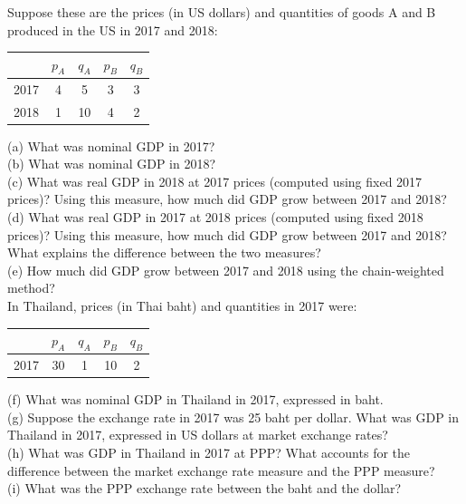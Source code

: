 \documentclass[12pt, letterpaper]{article}
\begin{document}
\begin{tcolorbox}[evenbox,title={Problem 1.2 \quad Comparisons Across Time and Across Countries}]
\begin{tcolorbox}[questionbox]
Suppose these are the prices (in US dollars) and quantities of goods A and B produced in the
US in 2017 and 2018:
\begin{center}
\begin{tabular}{ccccc}
\toprule
 & $p_A$ & $q_A$ & $p_B$ & $q_B$ \\
\midrule
2017 & 4 & 5  & 3 & 3 \\
2018 & 1 & 10 & 4 & 2 \\
\bottomrule
\end{tabular}
\end{center}
(a) What was nominal GDP in 2017?\\
(b) What was nominal GDP in 2018?\\
(c) What was real GDP in 2018 at 2017 prices (computed using fixed 2017 prices)? Using this
measure, how much did GDP grow between 2017 and 2018?\\
(d) What was real GDP in 2017 at 2018 prices (computed using fixed 2018 prices)? Using this
measure, how much did GDP grow between 2017 and 2018? What explains the difference between
the two measures?\\
(e) How much did GDP grow between 2017 and 2018 using the chain-weighted method?\\[4pt]
In Thailand, prices (in Thai baht) and quantities in 2017 were:
\begin{center}
\begin{tabular}{ccccc}
\toprule
 & $p_A$ & $q_A$ & $p_B$ & $q_B$ \\
\midrule
2017 & 30 & 1 & 10 & 2 \\
\bottomrule
\end{tabular}
\end{center}
(f) What was nominal GDP in Thailand in 2017, expressed in baht.\\
(g) Suppose the exchange rate in 2017 was 25 baht per dollar. What was GDP in Thailand in
2017, expressed in US dollars at market exchange rates?\\
(h) What was GDP in Thailand in 2017 at PPP? What accounts for the difference between the
market exchange rate measure and the PPP measure?\\
(i) What was the PPP exchange rate between the baht and the dollar?
\end{tcolorbox}


\end{tcolorbox}
\end{document}
